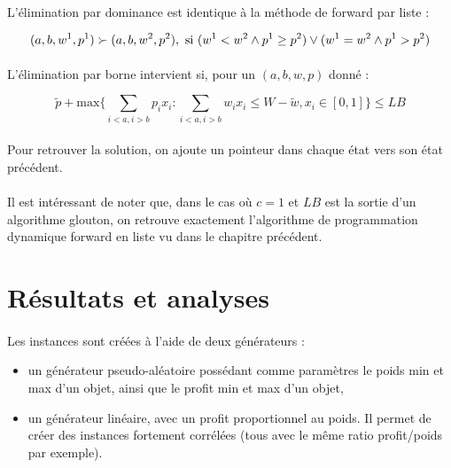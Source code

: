 \documentclass[12pt]{article}
\begin{document}
\paragraph{}L'élimination par dominance est identique à la méthode de forward par liste :

\[
(a,b,w^1,p^1)\succ(a,b,w^2,p^2), \textnormal{ si }
(w^1 < w^2 \wedge p^1 \geq p^2) \vee (w^1 = w^2 \wedge p^1 > p^2)
\]

\paragraph{}L'élimination par borne intervient si, pour un $(a,b,w,p)$ donné :

\[
\tilde{p}+\mathrm{max}
\lbrace
\sum_{i<a,i>b}p_i x_i : \sum_{i<a,i>b}w_i x_i \leq W - \tilde{w}, x_i \in [0,1]
\rbrace \leq LB
\]

\paragraph{}Pour retrouver la solution, on ajoute un pointeur dans chaque état vers son état précédent.

\paragraph{}Il est intéressant de noter que, dans le cas où $c=1$ et $LB$ est la sortie d'un algorithme glouton, on retrouve exactement l'algorithme de programmation dynamique forward en liste vu dans le chapitre précédent.

\section{Résultats et analyses}

\paragraph{}Les instances sont créées à l'aide de deux générateurs :
\begin{itemize}
\item un générateur pseudo-aléatoire possédant comme paramètres le poids min et max d'un objet, ainsi que le profit min et max d'un objet,
\item un générateur linéaire, avec un profit proportionnel au poids. Il permet de créer des instances fortement corrélées (tous avec le même ratio profit/poids par exemple).
\end{itemize}
\end{document}

